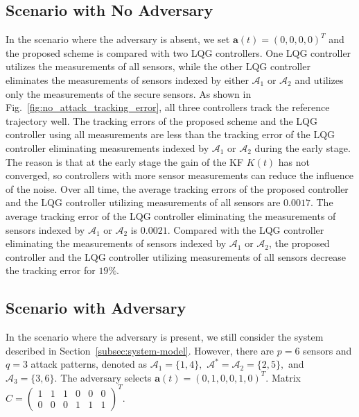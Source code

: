 \documentclass[journal]{IEEEtran}
\begin{document}
\subsection{Scenario with No Adversary}
In the scenario where the adversary is absent, we set $\mathbf{a}(t) = (0, 0, 0, 0)^T$ and the proposed scheme is compared with two LQG controllers. One LQG controller utilizes the measurements of all sensors, while the other LQG controller eliminates the measurements of sensors indexed by either $\mathcal{A}_1$ or $\mathcal{A}_2$ and utilizes only the measurements of the secure sensors. As shown in Fig.~\ref{fig:no_attack_tracking_error}, all three controllers track the reference trajectory well. The tracking errors of the proposed scheme and the LQG controller using all measurements are less than the tracking error of the LQG controller eliminating measurements indexed by $\mathcal{A}_1$ or $\mathcal{A}_2$ during the early stage. The reason is that at the early stage the gain of the KF $K(t)$ has not converged, so controllers with more sensor measurements can reduce the influence of the noise. Over all time, the average tracking errors of the proposed controller and the LQG controller utilizing measurements of all sensors are $0.0017.$ The average tracking error of the LQG controller eliminating the measurements of sensors indexed by $\mathcal{A}_1$ or $\mathcal{A}_2$ is $0.0021.$ Compared with the LQG controller eliminating the measurements of sensors indexed by $\mathcal{A}_1$ or $\mathcal{A}_2$, the proposed controller and the LQG controller utilizing measurements of all sensors decrease the tracking error for $19\%.$

\subsection{Scenario with Adversary}
In the scenario where the adversary is present, we still consider the system described in Section~\ref{subsec:system-model}. However, there are $p = 6$ sensors and $q = 3$ attack patterns, denoted as $\mathcal{A}_1 = \{1,4\},$ $\mathcal{A}^\ast = \mathcal{A}_2 = \{2,5\},$ and $\mathcal{A}_3 = \{3,6\}.$ The adversary selects $\mathbf{a}(t) = (0, 1, 0, 0, 1, 0)^T.$ Matrix
$C = {\begin{pmatrix}1&1&1&0&0&0\\0&0&0&1&1&1\end{pmatrix}}^T.$


\end{document}
